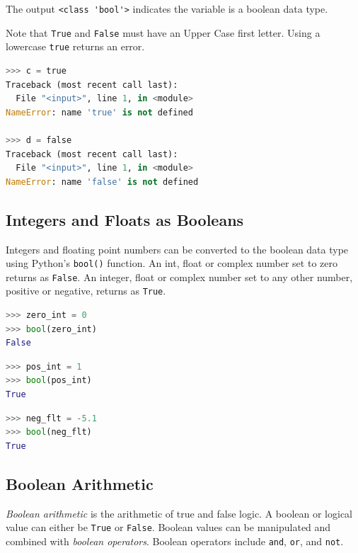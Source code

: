\documentclass{book}
\begin{document}
The output \lstinline!<class 'bool'>! indicates the variable is a
boolean data type.

Note that \lstinline!True! and \lstinline!False! must have an Upper Case
first letter. Using a lowercase \lstinline!true! returns an error.

\begin{lstlisting}[language=Python]
>>> c = true
Traceback (most recent call last):
  File "<input>", line 1, in <module>
NameError: name 'true' is not defined
   
>>> d = false
Traceback (most recent call last):
  File "<input>", line 1, in <module>
NameError: name 'false' is not defined
\end{lstlisting}
    




    
        \subsection{Integers and Floats as
Booleans}\label{integers-and-floats-as-booleans}

Integers and floating point numbers can be converted to the boolean data
type using Python's \lstinline!bool()! function. An int, float or
complex number set to zero returns as \lstinline!False!. An integer,
float or complex number set to any other number, positive or negative,
returns as \lstinline!True!.

\begin{lstlisting}[language=Python]
>>> zero_int = 0
>>> bool(zero_int)
False
\end{lstlisting}

\begin{lstlisting}[language=Python]
>>> pos_int = 1
>>> bool(pos_int)
True
\end{lstlisting}

\begin{lstlisting}[language=Python]
>>> neg_flt = -5.1
>>> bool(neg_flt)
True
\end{lstlisting}
    




    
        \subsection{Boolean Arithmetic}\label{boolean-arithmetic}

\emph{Boolean arithmetic} is the arithmetic of true and false logic. A
boolean or logical value can either be \lstinline!True! or
\lstinline!False!. Boolean values can be manipulated and combined with
\emph{boolean operators}. Boolean operators include \lstinline!and!,
\lstinline!or!, and \lstinline!not!.
\end{document}

